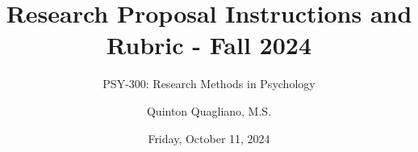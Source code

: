 \documentclass[
  12pt,
  letterpaper,
]{scrartcl}
\title{Research Proposal Instructions and Rubric - Fall 2024}
\subtitle{PSY-300: Research Methods in Psychology}
\author{Quinton Quagliano, M.S.}
\date{Friday, October 11, 2024}
\begin{document}


\begin{titlepage}


\newcommand{\titlepagepagealign}{
\ifthenelse{\equal{center}{right}}{\raggedleft}{}
\ifthenelse{\equal{center}{center}}{\centering}{}
\ifthenelse{\equal{center}{left}}{\raggedright}{}
}


\newcommand{\titleandsubtitle}{
{{\huge{\bfseries{\nohyphens{Research Proposal Instructions and Rubric -
Fall 2024}}}}\par
}%

\vspace{\betweentitlesubtitle}
{
{\Large{\nohyphens{PSY-300: Research Methods in Psychology}}}\par
}}
\newcommand{\titlepagetitleblock}{
\newcommand{\HRule}{\rule{\linewidth}{0.5mm}} 

\HRule\\[0.4cm]

\titleandsubtitle

\HRule\\
}
\newcommand{\authorstyle}[1]{{\small{#1}}}

\newcommand{\affiliationstyle}[1]{{\small{#1}}}

\newcommand{\titlepageauthorblock}{
\newlength{\miniA}
\setlength{\miniA}{0pt}
\newlength{\namelen}
\settowidth{\namelen}{Quinton Quagliano,
M.S.}\setlength{\miniA}{\maxof{\miniA}{\namelen}}
\setlength{\miniA}{\miniA+0.05\textwidth}
\newlength{\miniB}
\setlength{\miniB}{0.99\textwidth - \miniA}
\begin{minipage}{\miniA}
\begin{flushleft}
{\authorstyle{Quinton Quagliano, M.S.}}
\end{flushleft}
\end{minipage}
\begin{minipage}{\miniB}
\begin{flushright}
{\affiliationstyle{Department of Psychology
\\}}
\end{flushright}
\end{minipage}}

\newcommand{\titlepageaffiliationblock}{}
\newcommand{\headerstyled}{%
{\textsc{\LARGE{}}}
}
\newcommand{\footerstyled}{%
{}
}
\newcommand{\datestyled}{%
{\large{Friday, October 11, 2024}}
}


\newcommand{\titlepageheaderblock}{\headerstyled}


\end{titlepage}
\end{document}
